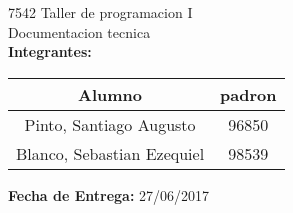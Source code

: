 \begin{titlepage}
    \vspace*{\fill}
    \begin{center}
        \Large 7542 Taller de programacion I \\
        \Huge Documentacion tecnica\\
        \bigskip\bigskip\bigskip
        \large\textbf{Integrantes:} \\
        \begin{center}
            \begin{tabular}{||c | c||}
                \hline
                Alumno & padron \\ [0.5ex]
                \hline\hline
                Pinto, Santiago Augusto & 96850 \\
                \hline
                Blanco, Sebastian Ezequiel & 98539 \\
                \hline
            \end{tabular}
        \end{center}
        \textbf{Fecha de Entrega:} 27/06/2017\\

    \end{center}
    \vspace*{\fill}
\end{titlepage}
